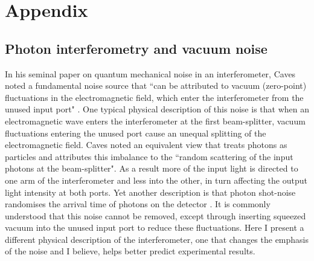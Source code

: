 \documentclass[reqno]{amsart}
\begin{document}
\section*{Appendix}
\subsection{Photon interferometry and vacuum noise}\label{App:LIGO}
%
In his seminal paper on quantum mechanical noise in an interferometer, Caves noted a fundamental noise source that ``can be attributed to vacuum (zero-point) fluctuations in the electromagnetic field, which enter the interferometer from the unused input port" \cite{Caves1981}. One typical physical description of this noise is that when an electromagnetic wave enters the interferometer at the first beam-splitter, vacuum fluctuations entering the unused port cause an unequal splitting of the electromagnetic field. Caves noted an equivalent view that treats photons as particles and attributes this imbalance to the ``random scattering of the input photons at the beam-splitter". As a result more of the input light is directed to one arm of the interferometer and less into the other, in turn affecting the output light intensity at both ports. Yet another description is that photon shot-noise randomises the arrival time of photons on the detector \cite{Tse2019}. It is commonly understood that this noise cannot be removed, except through inserting squeezed vacuum into the unused input port to reduce these fluctuations. Here I present a different physical description of the interferometer, one that changes the emphasis of the noise and I believe, helps better predict experimental results.
\end{document}
